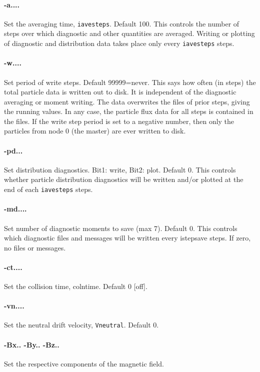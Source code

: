 \documentclass[12pt]{article}
\begin{document}
\paragraph{-a....}  Set the averaging time, \verb!iavesteps!. Default 100.
This controls the number of steps over which diagnostic and other
quantities are averaged. Writing or plotting of diagnostic and
distribution data takes place only every \verb!iavesteps! steps.

\paragraph{-w....}  Set period of write steps. Default 99999=never.
This says how often (in steps) the total particle data is written out to
disk. It is independent of the diagnostic averaging or moment writing.
The data overwrites the files of prior steps, giving the running
values. In any case, the particle flux data for all steps is contained in
the files. If the write step period is set to a negative number, then
only the particles from node 0 (the master) are ever
written to disk. 

\paragraph{-pd...}
Set distribution diagnostics. Bit1: write, Bit2: plot. Default 0.
This controls whether particle distribution diagnostics will be
written and/or plotted at the end of each \verb!iavesteps! steps. 

\paragraph{-md....}  Set number of diagnostic moments to save (max 7). Default 0.
This controls which diagnostic files and messages will be written
every istepsave steps. If zero, no files or messages.

\paragraph{-ct....} Set the collision time, colntime. Default 0 [off].

\paragraph{-vn....} Set the neutral drift velocity, \verb!Vneutral!. Default 0.

\paragraph{-Bx.. -By.. -Bz..} Set the respective components of the
magnetic field. 
\end{document}
